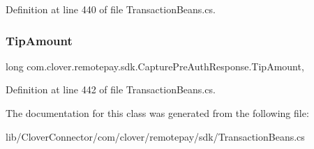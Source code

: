 Definition at line 440 of file Transaction\+Beans.\+cs.

\mbox{\label{classcom_1_1clover_1_1remotepay_1_1sdk_1_1_capture_pre_auth_response_a0ecf754c393aeaca1e0c6c1ea7c9a406}} 
\subsubsection{\texorpdfstring{Tip\+Amount}{TipAmount}}
{\footnotesize\ttfamily long com.\+clover.\+remotepay.\+sdk.\+Capture\+Pre\+Auth\+Response.\+Tip\+Amount\hspace{0.3cm}{\ttfamily [get]}, {\ttfamily [set]}}



Definition at line 442 of file Transaction\+Beans.\+cs.



The documentation for this class was generated from the following file\+:\begin{DoxyCompactItemize}
\item 
lib/\+Clover\+Connector/com/clover/remotepay/sdk/Transaction\+Beans.\+cs\end{DoxyCompactItemize}
